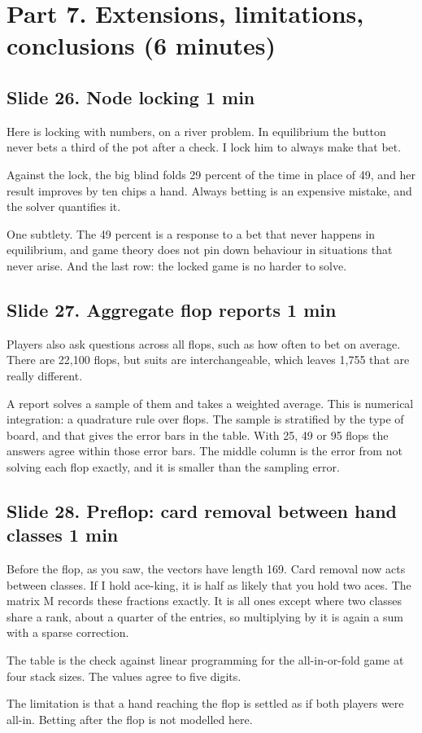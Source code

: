 \documentclass[11pt]{article}
\newcommand{\slidehead}[3]{\subsection*{Slide #1. #2 \hfill {\normalfont\small #3}}}
\begin{document}
\section{Part 7. Extensions, limitations, conclusions (6 minutes)}

\slidehead{26}{Node locking}{1 min}
\begin{say}
Here is locking with numbers, on a river problem. In equilibrium the button never bets a third of the pot after a
check. I lock him to always make that bet.

Against the lock, the big blind folds 29 percent of the time in place of 49, and her result improves by ten chips a
hand. Always betting is an expensive mistake, and the solver quantifies it.

One subtlety. The 49 percent is a response to a bet that never happens in equilibrium, and game theory does not pin
down behaviour in situations that never arise. And the last row: the locked game is no harder to solve.
\end{say}

\slidehead{27}{Aggregate flop reports}{1 min}
\begin{say}
Players also ask questions across all flops, such as how often to bet on average. There are 22,100 flops, but
suits are interchangeable, which leaves 1,755 that are really different.

A report solves a sample of them and takes a weighted average. This is numerical integration: a quadrature rule
over flops. The sample is stratified by the type of board, and that gives the error bars in the table. With 25, 49
or 95 flops the answers agree within those error bars. The middle column is the error from not solving each flop
exactly, and it is smaller than the sampling error.
\end{say}

\slidehead{28}{Preflop: card removal between hand classes}{1 min}
\begin{say}
Before the flop, as you saw, the vectors have length 169. Card removal now acts between classes. If I hold ace-king,
it is half as likely that you hold two aces. The matrix M records these fractions exactly. It is all ones except
where two classes share a rank, about a quarter of the entries, so multiplying by it is again a sum with a sparse
correction.

The table is the check against linear programming for the all-in-or-fold game at four stack sizes. The values agree
to five digits.

The limitation is that a hand reaching the flop is settled as if both players were all-in. Betting after the flop is
not modelled here.
\end{say}
\end{document}

